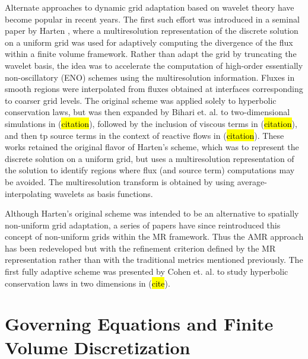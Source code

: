 \documentclass[12pt,letterpaper]{article}
\begin{document}
    Alternate approaches to dynamic grid adaptation based on wavelet theory have
    become popular in recent years. The first such effort was introduced in a
    seminal paper by Harten \cite{harten1994}, where a multiresolution
    representation of the discrete solution on a uniform grid was used for
    adaptively computing the divergence of the flux within a finite volume
    framework. Rather than adapt the grid by truncating the wavelet basis, the
    idea was to accelerate the computation of high-order essentially
    non-oscillatory (ENO) schemes using the multiresolution information. Fluxes
    in smooth regions were interpolated from fluxes obtained at interfaces
    corresponding to coarser grid levels. The original scheme was applied solely
    to hyperbolic conservation laws, but was then expanded by Bihari et. al. to
    two-dimensional simulations in (\hl{citation}), followed by the inclusion of
    viscous terms in (\hl{citation}), and then tp source terms in the context of
    reactive flows in (\hl{citation}). These works retained the original flavor
    of Harten's scheme, which was to represent the discrete solution on a
    uniform grid, but uses a multiresolution representation of the solution to
    identify regions where flux (and source term) computations may be avoided.
    The multiresolution transform is obtained by using average-interpolating
    wavelets as basis functions.

    Although Harten's original scheme was intended to be an alternative to
    spatially non-uniform grid adaptation, a series of papers have since
    reintroduced this concept of non-uniform grids within the MR framework. Thus
    the AMR approach has been redeveloped but with the refinement criterion
    defined by the MR representation rather than with the traditional metrics
    mentioned previously. The first fully adaptive scheme was presented by Cohen
    et. al. to study hyperbolic conservation laws in two dimensions in
    (\hl{cite}).

\section{Governing Equations and Finite Volume Discretization}
\end{document}
